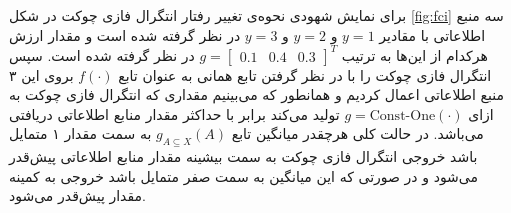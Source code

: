  برای نمایش شهودی نحوه‌ی تغییر رفتار انتگرال فازی چوکت در شکل
\ref{fig:fci}
سه منبع اطلاعاتی با مقادیر $y = 1$ و $y = 2$ و $y = 3$ در نظر گرفته شده است و مقدار ارزش هرکدام از این‌ها به ترتیب $g = \begin{bmatrix}0.1 & 0.4& 0.3\end{bmatrix}^T$ در نظر گرفته شده است. سپس انتگرال فازی چوکت را با در نظر گرفتن تابع همانی به عنوان تابع $f(\cdot)$ بروی این ۳ منبع اطلاعاتی اعمال کردیم و همانطور که می‌بینیم مقداری که انتگرال فازی چوکت به ازای $g = \text{Const-One}(\cdot)$ تولید می‌کند برابر با حداکثر مقدار منابع اطلاعاتی دریافتی می‌باشد. در حالت کلی هرچقدر میانگین تابع $g_{A \subseteq X}(A)$ به سمت مقدار ۱ متمایل باشد خروجی انتگرال فازی چوکت به سمت بیشینه مقدار منابع اطلاعاتی پیش‌قدر می‌شود و در صورتی که این میانگین به سمت صفر متمایل باشد خروجی به کمینه مقدار پیش‌قدر می‌شود.

